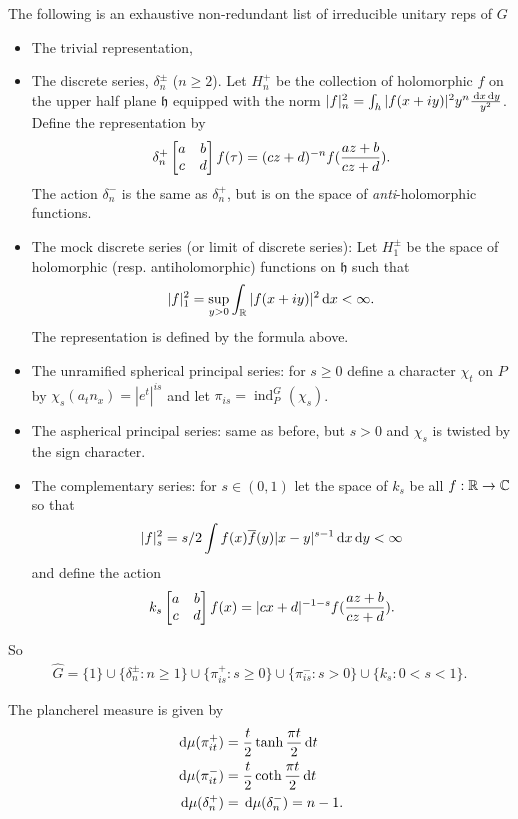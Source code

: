 \documentclass[11pt]{amsart}
\newcommand{\h}{\mathfrak{h}}
\newcommand{\ind}{\operatorname{ind}}
\begin{document}
The following is an exhaustive non-redundant list of irreducible unitary reps of $G$
\begin{itemize}
	\item The trivial representation,
	\item The discrete series, $\delta^{\pm}_{n}$ ($n\geq 2$). Let $H^{+}_{n}$ be the collection of holomorphic $f$ on the  upper half plane $\h$ equipped with the norm $|f|_{n}^{2}=\int_{h}|f(x+iy)|^{2}y^{n}\frac{\,{\rm d} x \,{\rm d} y}{y^{2}}$. Define the representation by
		\begin{align*}
			\delta_{n}^{+}\left[ \begin{matrix} a & b \\ c & d \end{matrix} \right]f(\tau)=(cz+d)^{-n}f(\frac{az+b}{cz+d}).
		\end{align*} 
	The action $\delta^{-}_{n}$ is the same as $\delta^{+}_{n}$, but is on the space of \emph{anti}-holomorphic functions.
	\item The mock discrete series (or limit of discrete series): Let $H^{\pm}_{1}$ be the space of holomorphic (resp. antiholomorphic) functions on $\h$ such that 
	\begin{align*}
		|f|^{2}_{1}=\sup_{y>0}\int_{\mathbb{R}}|f(x+iy)|^{2}\,{\rm d} x<\infty.
	\end{align*}
The representation is defined by the formula above. 
	\item The unramified spherical principal series: for $s\geq 0$ define a character $\chi_{t}$ on $P$ by $\chi_{s}(a_{t}n_{x})=|e^{t}|^{is}$ and let $\pi_{is}=\ind_{P}^{G}(\chi_{s})$. 
	\item The aspherical principal series: same as before, but $s>0$ and $\chi_{s}$ is twisted by the sign character. 
	\item The complementary series: for $s\in(0,1)$ let the space of $k_{s}$ be all $f:\mathbb{R}\to \mathbb{C}$ so that 
	\begin{align*}
		|f|_{s}^{2}=s/2 \int f(x)\overline{f}(y)|x-y|^{s-1}\,{\rm d} x \,{\rm d} y<\infty	
	\end{align*}
	and define the action 
	\begin{align*}
		k_{s}\left[ \begin{matrix} a & b \\ c & d \end{matrix} \right]f(x)=|cx+d|^{-1-s}f(\frac{az+b}{cz+d}). 
	\end{align*}
\end{itemize} 

So
	\begin{align*}
		\hat{G}=\{1\}\cup \{ \delta^{\pm}_{n}:n\geq 1\}\cup \{ \pi_{is}^{+}:s\geq0\} \cup \{ \pi^{-}_{is}: s>0\} \cup \{k_{s}: 0<s<1\}.
	\end{align*}

The plancherel measure is given by 
	\begin{align*}
		\,{\rm d} \mu(\pi_{it}^{+})&=\frac{t}{2}\tanh \frac{\pi t}{2} \,{\rm d} t \\
		\,{\rm d} \mu(\pi_{it}^{-})&=\frac{t}{2}\coth\frac{\pi t}{2} \,{\rm d} t\\
		\,{\rm d} \mu(\delta^{+}_{n})&=\,{\rm d} \mu( \delta^{-}_{n})=n-1.
	\end{align*}
	
\end{document}
